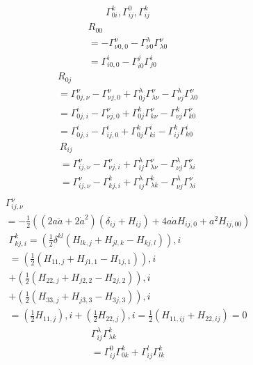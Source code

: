 \documentclass[12pt]{ctexart}
\theoremstyle{definition}
\begin{document}
\begin{eqnarray}
    \Gamma^{k}_{0i},\Gamma^{0}_{ij},\Gamma^{k}_{ij}
\end{eqnarray}
\begin{eqnarray}
    R_{00}\\
    =-\Gamma^{\nu}_{\nu0,0}
    -\Gamma^{\lambda}_{\nu0}\Gamma^{\nu}_{\lambda0}\\
    =\Gamma^{i}_{i0,0}
    -\Gamma^{j}_{i0}\Gamma^{i}_{j0}
\end{eqnarray}
\begin{eqnarray}
    R_{0j}\\
    =\Gamma^{\nu}_{0j,\nu}-\Gamma^{\nu}_{\nu j,0}
    +\Gamma^{\lambda}_{0j}\Gamma^{\nu}_{\lambda\nu}
    -\Gamma^{\lambda}_{\nu j}\Gamma^{\nu}_{\lambda0}\\
    =\Gamma^{i}_{0j,i}-\Gamma^{\nu}_{\nu j,0}
    +\Gamma^{k}_{0j}\Gamma^{\nu}_{k\nu}
    -\Gamma^{k}_{\nu j}\Gamma^{\nu}_{k0}\\
    =\Gamma^{i}_{0j,i}-\Gamma^{i}_{i j,0}
    +\Gamma^{k}_{0j}\Gamma^{i}_{ki}
    -\Gamma^{k}_{i j}\Gamma^{i}_{k0}
\end{eqnarray}
\begin{eqnarray}
    R_{ij}\\
    =\Gamma^{\nu}_{ij,\nu}-\Gamma^{\nu}_{\nu j,i}
    +\Gamma^{\lambda}_{ij}\Gamma^{\nu}_{\lambda\nu}
    -\Gamma^{\lambda}_{\nu j}\Gamma^{\nu}_{\lambda i}\\
    =\Gamma^{\nu}_{ij,\nu}-\Gamma^{k}_{k j,i}
    +\Gamma^{\lambda}_{ij}\Gamma^{k}_{\lambda k}
    -\Gamma^{\lambda}_{\nu j}\Gamma^{\nu}_{\lambda i}\\
\end{eqnarray}
\begin{eqnarray}
    \Gamma^{\nu}_{ij,\nu}\\
    =-\frac{1}{2}((2a\ddot{a}+2\dot{a}^2)(\delta_{ij}+H_{ij})+4a\dot{a}H_{ij,0}+a^2{H}_{ij,00})
\end{eqnarray}
\begin{eqnarray}
    \Gamma^{k}_{k j,i}=(\frac{1}{2}\delta^{kl}(H_{l k,j}+H_{j 
    l,k}-H_{kj,l})),i\\
    =(\frac{1}{2}(H_{11,j}+H_{j 
    1,1}-H_{1j,1})),i\\+(\frac{1}{2}(H_{22,j}+H_{j 
    2,2}-H_{2j,2})),i\\+(\frac{1}{2}(H_{33,j}+H_{j 
    3,3}-H_{3j,3})),i\\
    =(\frac{1}{2}H_{11,j}),i+(\frac{1}{2}H_{22,j}),i
    =\frac{1}{2}(H_{11,ij}+H_{22,ij})=0
\end{eqnarray}
\begin{eqnarray}
    \Gamma^{\lambda}_{ij}\Gamma^{k}_{\lambda k}\\
    =\Gamma^{0}_{ij}\Gamma^{k}_{0 k}+\Gamma^{l}_{ij}\Gamma^{k}_{l k}
\end{eqnarray}
\end{document}
